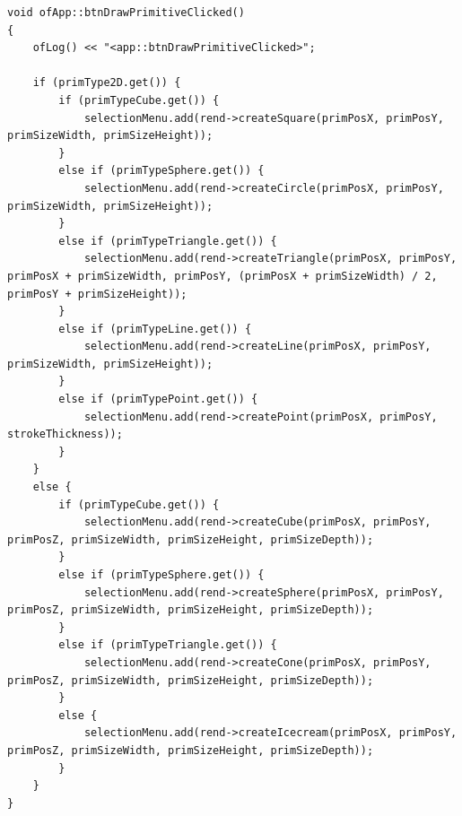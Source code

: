 \newpage

\begin{lstlisting}
void ofApp::btnDrawPrimitiveClicked()
{
	ofLog() << "<app::btnDrawPrimitiveClicked>";
	
	if (primType2D.get()) {
		if (primTypeCube.get()) {
			selectionMenu.add(rend->createSquare(primPosX, primPosY, primSizeWidth, primSizeHeight));
		}
		else if (primTypeSphere.get()) {
			selectionMenu.add(rend->createCircle(primPosX, primPosY, primSizeWidth, primSizeHeight));
		}
		else if (primTypeTriangle.get()) {
			selectionMenu.add(rend->createTriangle(primPosX, primPosY, primPosX + primSizeWidth, primPosY, (primPosX + primSizeWidth) / 2, primPosY + primSizeHeight));
		}
		else if (primTypeLine.get()) {
			selectionMenu.add(rend->createLine(primPosX, primPosY, primSizeWidth, primSizeHeight));
		}
		else if (primTypePoint.get()) {
			selectionMenu.add(rend->createPoint(primPosX, primPosY, strokeThickness));
		}
	}
	else {
		if (primTypeCube.get()) {
			selectionMenu.add(rend->createCube(primPosX, primPosY, primPosZ, primSizeWidth, primSizeHeight, primSizeDepth));
		}
		else if (primTypeSphere.get()) {
			selectionMenu.add(rend->createSphere(primPosX, primPosY, primPosZ, primSizeWidth, primSizeHeight, primSizeDepth));
		}
		else if (primTypeTriangle.get()) {
			selectionMenu.add(rend->createCone(primPosX, primPosY, primPosZ, primSizeWidth, primSizeHeight, primSizeDepth));
		}
		else {
			selectionMenu.add(rend->createIcecream(primPosX, primPosY, primPosZ, primSizeWidth, primSizeHeight, primSizeDepth));
		}
	}
}
\end{lstlisting}

\newpage

